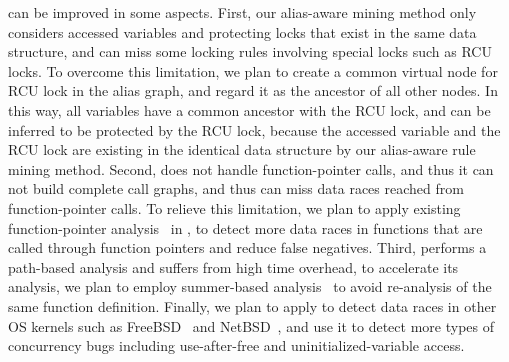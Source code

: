  \sys can be improved in some aspects. First, 
our alias-aware mining method only considers accessed variables and protecting 
locks that exist in the same data structure, and can miss some locking rules 
involving special locks such as RCU locks. To overcome this limitation, we plan 
to create a common virtual node for RCU lock in the alias graph, and regard it 
as the ancestor of all other nodes. In this way, all variables have a common 
ancestor with the RCU lock, and can be inferred to be protected by the RCU 
lock, because the accessed variable and the RCU lock are existing in the 
identical data structure by our alias-aware rule mining method. Second, \sys 
does not handle function-pointer calls, and thus it can not build complete call 
graphs, and thus can miss data races reached from function-pointer calls. To 
relieve this limitation, we plan to apply existing function-pointer 
analysis~\cite{Hind:TOPLAS99, Zhang:ISPEC15, Heintze:PLDI01} in \sys, to detect 
more data races in functions that are called through function pointers and 
reduce false negatives. Third, \sys performs a path-based analysis and suffers 
from high time overhead, to accelerate its analysis, we plan to employ 
summer-based analysis~\cite{Bai:ATC19, Bai:ATC22} to avoid re-analysis of the 
same function definition. Finally, we plan to apply \sys to detect data races 
in other OS kernels such as FreeBSD~\cite{FreeBSD} and NetBSD~\cite{NetBSD}, 
and use it to detect more types of concurrency bugs including use-after-free 
and uninitialized-variable access.
